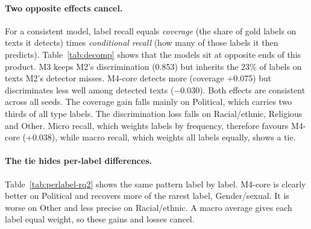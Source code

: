 \documentclass[11pt]{article}
\begin{document}
\paragraph{Two opposite effects cancel.}
For a consistent model, label recall equals \emph{coverage} (the share of
gold labels on texts it detects) times \emph{conditional recall} (how many
of those labels it then predicts). Table~\ref{tab:decomp} shows that the
models sit at opposite ends of this product. M3 keeps M2's discrimination
(0.853) but inherits the 23\% of labels on texts M2's detector misses.
M4-core detects more (coverage +0.075) but discriminates less well among
detected texts ($-$0.030). Both effects are consistent across all seeds. The
coverage gain falls mainly on Political, which carries two thirds of all
type labels. The discrimination loss falls on Racial/ethnic, Religious and
Other. Micro recall, which weights labels by frequency, therefore favours
M4-core (+0.038), while macro recall, which weights all labels equally,
shows a tie.

\begin{table}[t]
\centering\small
\setlength{\tabcolsep}{3pt}
\caption{\textbf{RQ2 per label}: M4-core minus M3 on gold-polarized texts
(exploratory). Bold: the 95\% interval excludes zero.}
\label{tab:perlabel-rq2}
\end{table}

\paragraph{The tie hides per-label differences.}
Table~\ref{tab:perlabel-rq2} shows the same pattern label by label. M4-core
is clearly better on Political and recovers more of the rarest label,
Gender/sexual. It is worse on Other and less precise on Racial/ethnic. A
macro average gives each label equal weight, so these gains and losses
cancel.
\end{document}
